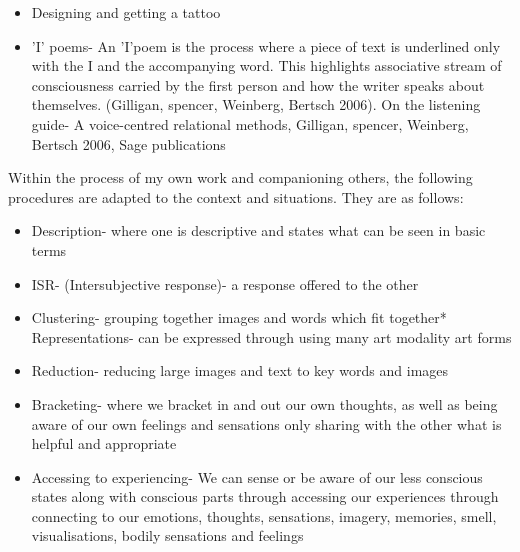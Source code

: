 \begin{itemize}
\item Designing and getting a tattoo
\end{itemize}

\begin{itemize}
\item  'I' poems- An 'I'poem is the process where a piece of text is underlined only with the I and the accompanying word. This highlights associative stream of consciousness carried by the first person and how the writer speaks about themselves. (Gilligan, spencer, Weinberg, Bertsch 2006). On the listening guide- A voice-centred relational methods, Gilligan, spencer, Weinberg, Bertsch 2006, Sage publications
\end{itemize}

Within the process of my own work and companioning others, the following procedures are adapted to the context and situations. They are as follows:
\begin{itemize}
\item Description- where one is descriptive and states what can be seen in basic terms 
\end{itemize}

\begin{itemize}
\item ISR- (Intersubjective response)- a response offered to the other
\end{itemize}

\begin{itemize}
\item  Clustering- grouping together images and words which fit together* Representations- can be expressed through using many art modality art forms
\end{itemize}

\begin{itemize}
\item Reduction- reducing large images and text to key words and images 
\end{itemize}

\begin{itemize}
\item Bracketing- where we bracket in and out our own thoughts, as well as being aware of our own feelings and sensations only sharing with the other what is helpful and appropriate
\end{itemize}

\begin{itemize}
\item Accessing to experiencing- We can sense or be aware of our less conscious states along with conscious parts through accessing our experiences through connecting to our emotions, thoughts, sensations, imagery, memories, smell, visualisations, bodily sensations and feelings
\end{itemize}

